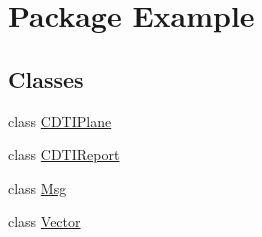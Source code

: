 \hypertarget{namespace_example}{}\section{Package Example}
\label{namespace_example}
\subsection*{Classes}
\begin{DoxyCompactItemize}
\item 
class \hyperlink{class_example_1_1_c_d_t_i_plane}{C\+D\+T\+I\+Plane}
\item 
class \hyperlink{class_example_1_1_c_d_t_i_report}{C\+D\+T\+I\+Report}
\item 
class \hyperlink{class_example_1_1_msg}{Msg}
\item 
class \hyperlink{class_example_1_1_vector}{Vector}
\end{DoxyCompactItemize}
